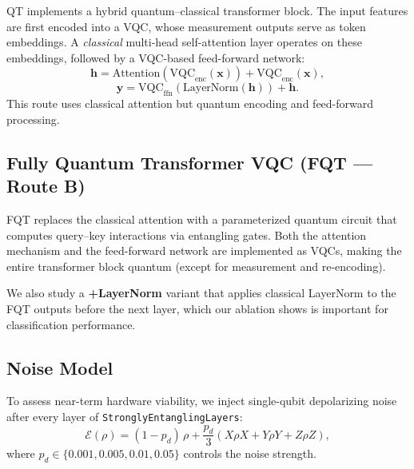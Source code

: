 QT implements a hybrid quantum--classical transformer block.  The input
features are first encoded into a VQC, whose measurement outputs serve as
token embeddings.  A \emph{classical} multi-head self-attention layer
operates on these embeddings, followed by a VQC-based feed-forward network:
\begin{equation}
  \mathbf{h} = \mathrm{Attention}(\mathrm{VQC}_{\mathrm{enc}}(\mathbf{x}))
  + \mathrm{VQC}_{\mathrm{enc}}(\mathbf{x}),
\end{equation}
\begin{equation}
  \mathbf{y} = \mathrm{VQC}_{\mathrm{ffn}}(\mathrm{LayerNorm}(\mathbf{h}))
  + \mathbf{h}.
\end{equation}
This route uses classical attention but quantum encoding and feed-forward
processing.

\subsection{Fully Quantum Transformer VQC (FQT --- Route B)}

FQT replaces the classical attention with a parameterized quantum circuit
that computes query--key interactions via entangling gates.  Both the
attention mechanism and the feed-forward network are implemented as VQCs,
making the entire transformer block quantum (except for measurement and
re-encoding).

We also study a \textbf{+LayerNorm} variant that applies classical
LayerNorm to the FQT outputs before the next layer, which our ablation
shows is important for classification performance.

\subsection{Noise Model}
\label{sec:noise-model}

To assess near-term hardware viability, we inject single-qubit depolarizing
noise after every layer of \texttt{StronglyEntanglingLayers}:
\begin{equation}
  \mathcal{E}(\rho) = (1 - p_d)\,\rho + \frac{p_d}{3}(X\rho X + Y\rho Y + Z\rho Z),
\end{equation}
where $p_d \in \{0.001, 0.005, 0.01, 0.05\}$ controls the noise strength.
